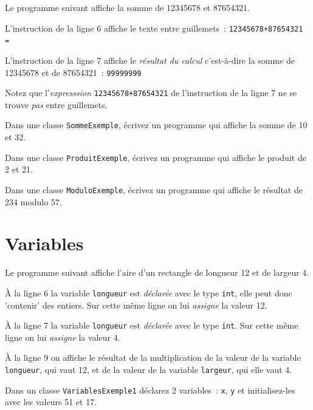 \documentclass[a4paper,11pt]{article}
\begin{document}
	Le programme suivant affiche la somme de 12345678 et 87654321.
	

	L'instruction de la ligne 6 affiche le texte entre guillemets~: \texttt{12345678+87654321 = }
	
	L'instruction de la ligne 7 affiche le \emph{résultat du calcul} c'est-à-dire la somme de 12345678 et de 87654321~: 
	\texttt{99999999}
	
	Notez que l'\emph{expresssion} \texttt{12345678+87654321} de l'instruction de la ligne 7 
	ne se trouve \emph{pas} entre guillemets.

	\hspeparator


	\Exercice{}
		Dans une classe \texttt{SommeExemple}, écrivez un programme qui affiche la somme de 10 et 32.

	\Exercice{}
		Dans une classe \texttt{ProduitExemple}, écrivez un programme qui affiche le produit de 2 et 21.
	
	\Exercice{}
		Dans une classe \texttt{ModuloExemple}, écrivez un programme qui affiche le résultat de 234 modulo 57.


\section{Variables}

	Le programme suivant affiche l'aire d'un rectangle de longueur 12 et de largeur 4.
	

	\`A la ligne 6 la variable \texttt{longueur} est \emph{déclarée} avec le type \texttt{int}, 
	elle peut donc 'contenir' des entiers. 
	Sur cette même ligne on lui \emph{assigne} la valeur 12.  

	\`A la ligne 7 la variable \texttt{longueur} est \emph{déclarée} avec le type \texttt{int}. 
	Sur cette même ligne on lui \emph{assigne} la valeur 4.
	
	\`A la ligne 9 on affiche le résultat de la multiplication de la valeur de la variable \texttt{longueur}, 
	qui vaut 12, et de la valeur de la variable \texttt{largeur}, qui elle vaut 4.  
  



	\hspeparator

	\Exercice{} 		
		Dans un classe \texttt{VariablesExemple1} déclarez 2 variables~: 
		\texttt{x}, \texttt{y} et initialisez-les avec les valeurs 51 et 17.
		
\end{document}
